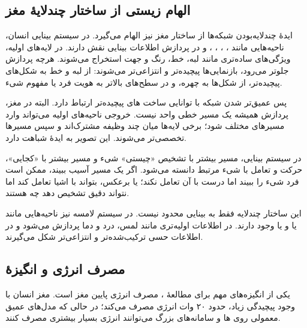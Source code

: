 \subsection{الهام زیستی از ساختار چندلایهٔ مغز}
ایدهٔ چندلایه‌بودن شبکه‌ها از ساختار مغز نیز الهام می‌گیرد. در سیستم بینایی انسان، ناحیه‌هایی مانند ، ، ، ،  و  در پردازش اطلاعات بینایی نقش دارند. در لایه‌های اولیه، ویژگی‌های ساده‌تری مانند لبه، خط، رنگ و جهت استخراج می‌شوند. هرچه پردازش جلوتر می‌رود، بازنمایی‌ها پیچیده‌تر و انتزاعی‌تر می‌شوند: از لبه و خط به شکل‌های پیچیده‌تر، از شکل‌ها به چهره، و در سطح‌های بالاتر به هویت فرد یا مفهوم شیء.

پس عمیق‌تر شدن شبکه با توانایی ساخت های پیچیده‌تر ارتباط دارد. البته در مغز، پردازش همیشه یک مسیر خطی واحد نیست. خروجی ناحیه‌های اولیه می‌تواند وارد مسیرهای مختلف شود؛ برخی لایه‌ها میان چند وظیفه مشترک‌اند و سپس مسیرها تخصصی‌تر می‌شوند. این تصویر به ایدهٔ  شباهت دارد.

در سیستم بینایی، مسیر  بیشتر با تشخیص «چیستی» شیء و مسیر  بیشتر با «کجایی»، حرکت و تعامل با شیء مرتبط دانسته می‌شود. اگر یک مسیر آسیب ببیند، ممکن است فرد شیء را ببیند اما درست با آن تعامل نکند؛ یا برعکس، بتواند با اشیا تعامل کند اما نتواند دقیق تشخیص دهد چه هستند.

این ساختار چندلایه فقط به بینایی محدود نیست. در سیستم لامسه نیز ناحیه‌هایی مانند  یا  و  یا  وجود دارند. در  اطلاعات اولیه‌تری مانند لمس، درد و دما پردازش می‌شود و در  اطلاعات حسی ترکیب‌شده‌تر و انتزاعی‌تر شکل می‌گیرند.



\subsection{مصرف انرژی و انگیزهٔ }
یکی از انگیزه‌های مهم برای مطالعهٔ ، مصرف انرژی پایین مغز است. مغز انسان با وجود پیچیدگی زیاد، حدود ۲۰ وات انرژی مصرف می‌کند؛ در حالی که مدل‌های عمیق معمولی روی ها و سامانه‌های بزرگ می‌توانند انرژی بسیار بیشتری مصرف کنند.

